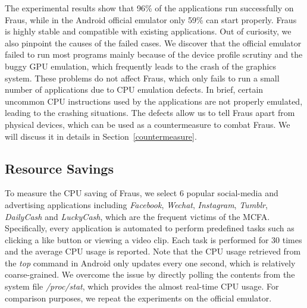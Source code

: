 \documentclass[conference]{IEEEtranl}
\begin{document}
	The experimental results show that 96\% of the applications run successfully on Fraus, while in the Android official emulator only 59\% can start properly. Fraus is highly stable and compatible with existing applications. Out of curiosity, we also pinpoint the causes of the failed cases.
	We discover that the official emulator failed to run most programs mainly because of the device profile scrutiny and the buggy GPU emulation, which frequently leads to the crash of the graphics system. These problems do not affect Fraus, which only fails to run a small number of applications due to CPU emulation defects. In brief, certain uncommon CPU instructions used by the applications are not properly emulated, leading to the crashing situations. The defects allow us to tell Fraus apart from physical devices, which can be used as a countermeasure to combat Fraus. We will discuss it in details in Section~\ref{countermeasure}.



	\subsection{Resource Savings}
	To measure the CPU saving of Fraus, we select 6 popular social-media and advertising applications including \textit{Facebook}, \textit{Wechat}, \textit{Instagram}, \textit{Tumblr}, \textit{DailyCash} and \textit{LuckyCash}, which are the frequent victims of the MCFA. Specifically, every application is automated to perform predefined tasks such as clicking a like button or viewing a video clip. Each task is performed for 30 times and the average CPU usage is reported. Note that 
	the CPU usage retrieved from the \textit{top} command in Android only updates every one second, which is relatively coarse-grained. We overcome the issue by directly polling the contents from the system file \textit{/proc/stat}, which provides the almost real-time CPU usage. For comparison purposes, we repeat the experiments on the official emulator.
\end{document}
